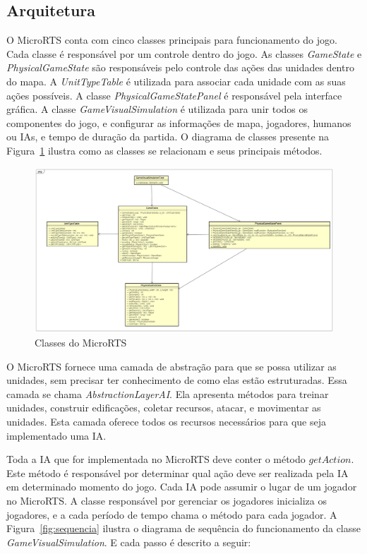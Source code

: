 \subsection{Arquitetura}

O MicroRTS conta com cinco classes principais para funcionamento do jogo. 
Cada classe é responsável por um controle dentro do jogo.
As classes \textit{GameState} e \textit{PhysicalGameState} são responsáveis pelo controle das ações das unidades dentro do mapa.
A \textit{UnitTypeTable} é utilizada para associar cada unidade com as suas ações possíveis.
A classe \textit{PhysicalGameStatePanel} é responsável pela interface gráfica.
A classe \textit{GameVisualSimulation} é utilizada para unir todos os componentes do jogo, e configurar as informações de mapa, jogadores, humanos ou IAs, e tempo de duração da partida.
O diagrama de classes presente na Figura~\ref{fig:classes} ilustra como as classes se relacionam e seus principais métodos.

\begin{figure}[ht]
	\centering
	\includegraphics[width=1\textwidth]{fig/classes.png}
	\caption{Classes do MicroRTS}
	\label{fig:classes}
\end{figure} 

O MicroRTS fornece uma camada de abstração para que se possa utilizar as unidades, sem precisar ter conhecimento de como elas estão estruturadas. 
Essa camada se chama \textit{AbstractionLayerAI}. 
Ela apresenta métodos para treinar unidades, construir edificações, coletar recursos, atacar, e movimentar as unidades. 
Esta camada oferece todos os recursos necessários para que seja implementado uma IA.

Toda a IA que for implementada no MicroRTS deve conter o método $\mathit{getAction}$.
Este método é responsável por determinar qual ação deve ser realizada pela IA em determinado momento do jogo.
Cada IA pode assumir o lugar de um jogador no MicroRTS. 
A classe responsável por gerenciar os jogadores inicializa os jogadores, e a cada período de tempo chama o método para cada jogador.
A Figura~\ref{fig:sequencia} ilustra o diagrama de sequência do funcionamento da classe \textit{GameVisualSimulation}. E cada passo é descrito a seguir:

